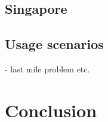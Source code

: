 \documentclass[10pt,a4paper,draft]{report}
\begin{document}
\section{Singapore}

\section{Usage scenarios}

- last mile problem etc.

\chapter{Conclusion}

\end{document}
